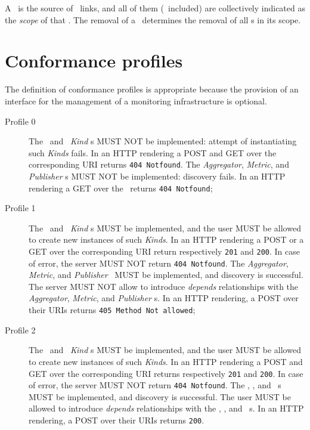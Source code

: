 \documentclass[10pt,a4paper]{article}
\begin{document}
A \sens\ is the source of \coll\ links, and all of them (\sens\ included) are collectively indicated as the {\em scope} of that \sens . The removal of a \sens\ determines the removal of all \coll s in its scope.

\section{Conformance profiles}

The definition of conformance profiles is appropriate because the provision of an interface for the management of a monitoring infrastructure is optional. 

\begin{description}

\item[Profile 0] The \coll\ and \sens\ {\em Kind} s MUST NOT be implemented: attempt of instantiating such {\em Kinds} fails.  In an HTTP rendering a POST and GET over the corresponding URI returns {\tt 404 Notfound}. The {\em Aggregator}, {\em Metric}, and {\em Publisher} \mi s MUST NOT be implemented: discovery fails. In an HTTP rendering a GET over the \mi\ returns {\tt 404 Notfound}; 

\item[Profile 1] The \coll\ and \sens\ {\em Kind} s MUST be implemented, and the user MUST be allowed to create new instances of such {\em Kinds}.  In an HTTP rendering a POST or a GET over the corresponding URI return respectively {\tt 201} and {\tt 200}. In case of error, the server MUST NOT return {\tt 404 Notfound}. The {\em Aggregator}, {\em Metric}, and {\em Publisher} \mi\ MUST be implemented, and discovery is successful. The server MUST NOT allow to introduce {\em depends} relationships with the {\em Aggregator}, {\em Metric}, and {\em Publisher} \mi s. In an HTTP rendering, a POST over their URIs returns {\tt 405 Method Not allowed}; 

\item[Profile 2]  The \coll\ and \sens\ {\em Kind} s MUST be implemented, and the user MUST be allowed to create new instances of such {\em Kinds}.  In an HTTP rendering a POST and GET over the corresponding URI returns respectively {\tt 201} and {\tt 200}. In case of error, the server MUST NOT return {\tt 404 Notfound}. The \aggr , \metr , and \publ\ \mi s MUST be implemented, and discovery is successful. The user MUST be allowed to introduce {\em depends} relationships with the  \aggr , \metr , and \publ\ \mi s. In an HTTP rendering, a POST over their URIs returns {\tt 200}.

\end{description}
\end{document}
